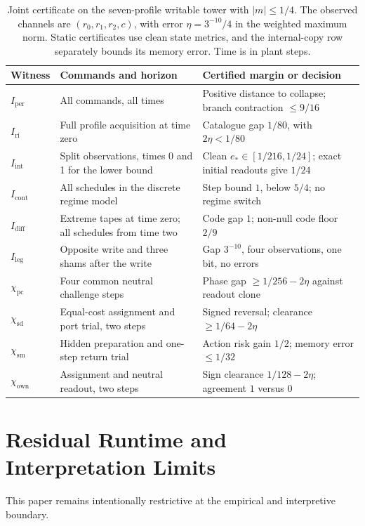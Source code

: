 \documentclass[11pt,a4paper]{article}
\theoremstyle{definition}
\newcommand{\Iper}{I_{\mathrm{per}}}
\newcommand{\Iri}{I_{\mathrm{ri}}}
\newcommand{\Iint}{I_{\mathrm{int}}}
\newcommand{\Icont}{I_{\mathrm{cont}}}
\newcommand{\Idiff}{I_{\mathrm{diff}}}
\newcommand{\Ileg}{I_{\mathrm{leg}}}
\newcommand{\Priv}{\chi_{\mathrm{pc}}}
\newcommand{\SelfDisc}{\chi_{\mathrm{sd}}}
\newcommand{\SelfModel}{\chi_{\mathrm{sm}}}
\newcommand{\Own}{\chi_{\mathrm{own}}}
\begin{document}
\begin{table}[htbp]
\centering\small
\caption{Joint certificate on the seven-profile writable tower with $|m|\le1/4$. The observed channels are $(r_0,r_1,r_2,c)$, with error $\eta=3^{-10}/4$ in the weighted maximum norm. Static certificates use clean state metrics, and the internal-copy row separately bounds its memory error. Time is in plant steps.}
\label{tab:writable-tower-joint-certificate}
\begin{tabularx}{\textwidth}{@{}l X X@{}}
\toprule
Witness & Commands and horizon & Certified margin or decision \\
\midrule
$\Iper$ & All commands, all times & Positive distance to collapse; branch contraction $\le9/16$ \\
$\Iri$ & Full profile acquisition at time zero & Catalogue gap $1/80$, with $2\eta<1/80$ \\
$\Iint$ & Split observations, times 0 and 1 for the lower bound & Clean $e_\ast\in[1/216,1/24]$; exact initial readouts give $1/24$ \\
$\Icont$ & All schedules in the discrete regime model & Step bound $1$, below $5/4$; no regime switch \\
$\Idiff$ & Extreme tapes at time zero; all schedules from time two & Code gap $1$; non-null code floor $2/9$ \\
$\Ileg$ & Opposite write and three shams after the write & Gap $3^{-10}$, four observations, one bit, no errors \\
$\Priv$ & Four common neutral challenge steps & Phase gap $\ge1/256-2\eta$ against readout clone \\
$\SelfDisc$ & Equal-cost assignment and port trial, two steps & Signed reversal; clearance $\ge1/64-2\eta$ \\
$\SelfModel$ & Hidden preparation and one-step return trial & Action risk gain $1/2$; memory error $\le1/32$ \\
$\Own$ & Assignment and neutral readout, two steps & Sign clearance $1/128-2\eta$; agreement $1$ versus $0$ \\
\bottomrule
\end{tabularx}
\end{table}

\section{Residual Runtime and Interpretation Limits}
This paper remains intentionally restrictive at the empirical and interpretive boundary.
\end{document}
